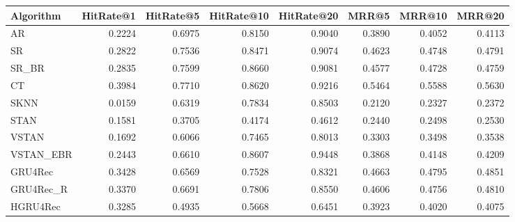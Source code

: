 \begin{tabular}{lrrrrrrr}
\toprule
 Algorithm &  HitRate@1 &  HitRate@5 &  HitRate@10 &  HitRate@20 &   MRR@5 &  MRR@10 &  MRR@20 \\
\midrule
        AR &     0.2224 &     0.6975 &      0.8150 &      0.9040 &  0.3890 &  0.4052 &  0.4113 \\
        SR &     0.2822 &     0.7536 &      0.8471 &      0.9074 &  0.4623 &  0.4748 &  0.4791 \\
     SR\_BR &     0.2835 &     0.7599 &      0.8660 &      0.9081 &  0.4577 &  0.4728 &  0.4759 \\
        CT &     0.3984 &     0.7710 &      0.8620 &      0.9216 &  0.5464 &  0.5588 &  0.5630 \\
      SKNN &     0.0159 &     0.6319 &      0.7834 &      0.8503 &  0.2120 &  0.2327 &  0.2372 \\
      STAN &     0.1581 &     0.3705 &      0.4174 &      0.4612 &  0.2440 &  0.2498 &  0.2530 \\
     VSTAN &     0.1692 &     0.6066 &      0.7465 &      0.8013 &  0.3303 &  0.3498 &  0.3538 \\
 VSTAN\_EBR &     0.2443 &     0.6610 &      0.8607 &      0.9448 &  0.3868 &  0.4148 &  0.4209 \\
   GRU4Rec &     0.3428 &     0.6569 &      0.7528 &      0.8321 &  0.4663 &  0.4795 &  0.4851 \\
 GRU4Rec\_R &     0.3370 &     0.6691 &      0.7806 &      0.8550 &  0.4606 &  0.4756 &  0.4810 \\
  HGRU4Rec &     0.3285 &     0.4935 &      0.5668 &      0.6451 &  0.3923 &  0.4020 &  0.4075 \\
\bottomrule
\end{tabular}
